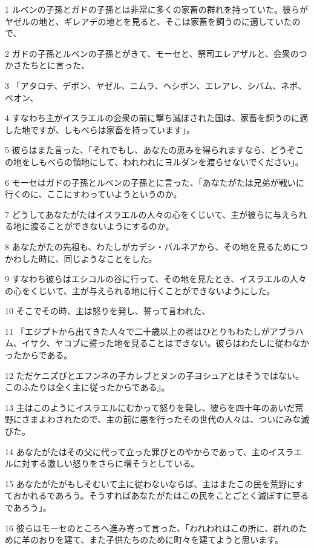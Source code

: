 \par 1 ルベンの子孫とガドの子孫とは非常に多くの家畜の群れを持っていた。彼らがヤゼルの地と、ギレアデの地とを見ると、そこは家畜を飼うのに適していたので、
\par 2 ガドの子孫とルベンの子孫とがきて、モーセと、祭司エレアザルと、会衆のつかさたちとに言った、
\par 3 「アタロテ、デボン、ヤゼル、ニムラ、ヘシボン、エレアレ、シバム、ネボ、ベオン、
\par 4 すなわち主がイスラエルの会衆の前に撃ち滅ぼされた国は、家畜を飼うのに適した地ですが、しもべらは家畜を持っています」。
\par 5 彼らはまた言った、「それでもし、あなたの恵みを得られますなら、どうぞこの地をしもべらの領地にして、われわれにヨルダンを渡らせないでください」。
\par 6 モーセはガドの子孫とルベンの子孫とに言った、「あなたがたは兄弟が戦いに行くのに、ここにすわっていようというのか。
\par 7 どうしてあなたがたはイスラエルの人々の心をくじいて、主が彼らに与えられる地に渡ることができないようにするのか。
\par 8 あなたがたの先祖も、わたしがカデシ・バルネアから、その地を見るためにつかわした時に、同じようなことをした。
\par 9 すなわち彼らはエシコルの谷に行って、その地を見たとき、イスラエルの人々の心をくじいて、主が与えられる地に行くことができないようにした。
\par 10 そこでその時、主は怒りを発し、誓って言われた、
\par 11 『エジプトから出てきた人々で二十歳以上の者はひとりもわたしがアブラハム、イサク、ヤコブに誓った地を見ることはできない。彼らはわたしに従わなかったからである。
\par 12 ただケニズびとエフンネの子カレブとヌンの子ヨシュアとはそうではない。このふたりは全く主に従ったからである』。
\par 13 主はこのようにイスラエルにむかって怒りを発し、彼らを四十年のあいだ荒野にさまよわされたので、主の前に悪を行ったその世代の人々は、ついにみな滅びた。
\par 14 あなたがたはその父に代って立った罪びとのやからであって、主のイスラエルに対する激しい怒りをさらに増そうとしている。
\par 15 あなたがたがもしそむいて主に従わないならば、主はまたこの民を荒野にすておかれるであろう。そうすればあなたがたはこの民をことごとく滅ぼすに至るであろう」。
\par 16 彼らはモーセのところへ進み寄って言った、「われわれはこの所に、群れのために羊のおりを建て、また子供たちのために町々を建てようと思います。
